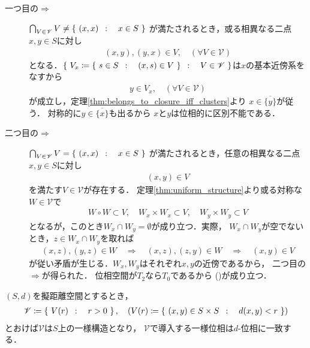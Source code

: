 	\begin{prf}\mbox{}
		\begin{description}
			\item[一つ目の$\Longrightarrow$]
				$\bigcap_{V \in \mathscr{V}}V \neq \left\{\ (x,x)\ \, : \quad x \in S\ \right\}$
				が満たされるとき，或る相異なる二点$x,y \in S$に対し
				\begin{align}
					(x,y),(y,x) \in V, \quad (\forall V \in \mathscr{V})
				\end{align}
				となる．$\left\{\ V_x \coloneqq \left\{\ s \in S\ \, : \quad (x,s) \in V\ \right\}\ \, : \quad V \in \mathscr{V}\ \right\}$は$x$の基本近傍系をなすから
				\begin{align}
					y \in V_x, \quad (\forall V \in \mathscr{V})
				\end{align}
				が成立し，定理\ref{thm:belongs_to_closure_iff_clusters}より
				$x \in \overline{\{y\}}$が従う．
				対称的に$y \in \overline{\{x\}}$も出るから
				$x$と$y$は位相的に区別不能である．
				
			\item[二つ目の$\Longrightarrow$]
				$\bigcap_{V \in \mathscr{V}}V = \left\{\ (x,x)\ \, : \quad x \in S\ \right\}$
				が満たされるとき，任意の相異なる二点$x,y \in S$に対し
				\begin{align}
					(x,y) \in V
				\end{align}
				を満たす$V \in \mathscr{V}$が存在する．
				定理\ref{thm:uniform_structure}より或る対称な$W \in \mathscr{V}$で
				\begin{align}
					W \circ W \subset V,
					\quad W_x \times W_x \subset V,
					\quad W_y \times W_y \subset V
				\end{align}
				となるが，このとき$W_x \cap W_y = \emptyset$が成り立つ．実際，
				$W_x \cap W_y$が空でないとき，$z \in W_x \cap W_y$を取れば
				\begin{align}
					(x,z),(y,z) \in W \quad \Longrightarrow \quad
					(x,z),(z,y) \in W \quad \Longrightarrow \quad
					(x,y) \in V
				\end{align}
				が従い矛盾が生じる．$W_x,W_y$はそれぞれ$x,y$の近傍であるから，
				二つ目の$\Longrightarrow$が得られた．
				位相空間が$T_2$なら$T_0$であるから
				()が成り立つ．
				\QED
		\end{description}
	\end{prf}
	
	\begin{screen}
		\begin{thm}[擬距離空間の一様構造]
		\label{thm:uniform_structure_on_pseudometric_spaces}
			$(S,d)$を擬距離空間とするとき，
			\begin{align}
				\mathscr{V} \coloneqq
				\left\{\ V(r)\ \, : \quad r > 0\ \right\},
				\quad (V(r) \coloneqq \left\{\ (x,y) \in S \times S\ \, : \quad d(x,y) < r\ \right\})
			\end{align}
			とおけば$\mathscr{V}$は$S$上の一様構造となり，
			$\mathscr{V}$で導入する一様位相は$d$-位相に一致する．
		\end{thm}
	\end{screen}
	
